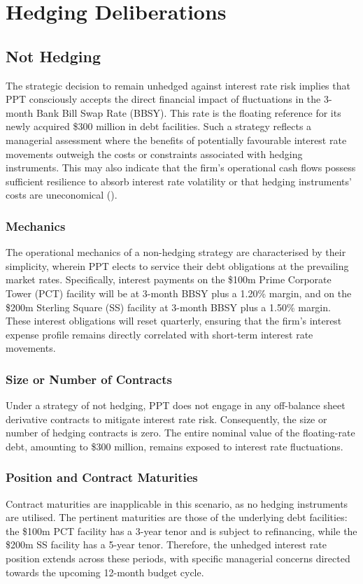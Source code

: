 \documentclass[11pt, a4paper, british]{article}
\begin{document}
\section{Hedging Deliberations}

\subsection{Not Hedging}
The strategic decision to remain unhedged against interest rate risk implies that PPT consciously accepts the direct financial impact of fluctuations in the 3-month Bank Bill Swap Rate (BBSY). This rate is the floating reference for its newly acquired \$300 million in debt facilities. Such a strategy reflects a managerial assessment where the benefits of potentially favourable interest rate movements outweigh the costs or constraints associated with hedging instruments. This may also indicate that the firm's operational cash flows possess sufficient resilience to absorb interest rate volatility or that hedging instruments' costs are uneconomical (\cite{sr}).
\subsubsection{Mechanics}
The operational mechanics of a non-hedging strategy are characterised by their simplicity, wherein PPT elects to service their debt obligations at the prevailing market rates. Specifically, interest payments on the \$100m Prime Corporate Tower (PCT) facility will be at 3-month BBSY plus a 1.20\% margin, and on the \$200m Sterling Square (SS) facility at 3-month BBSY plus a 1.50\% margin. These interest obligations will reset quarterly, ensuring that the firm's interest expense profile remains directly correlated with short-term interest rate movements.
\subsubsection{Size or Number of Contracts}
Under a strategy of not hedging, PPT does not engage in any off-balance sheet derivative contracts to mitigate interest rate risk. Consequently, the size or number of hedging contracts is zero. The entire nominal value of the floating-rate debt, amounting to \$300 million, remains exposed to interest rate fluctuations.

\subsubsection{Position and Contract Maturities}
Contract maturities are inapplicable in this scenario, as no hedging instruments are utilised. The pertinent maturities are those of the underlying debt facilities: the \$100m PCT facility has a 3-year tenor and is subject to refinancing, while the \$200m SS facility has a 5-year tenor. Therefore, the unhedged interest rate position extends across these periods, with specific managerial concerns directed towards the upcoming 12-month budget cycle.
\end{document}
